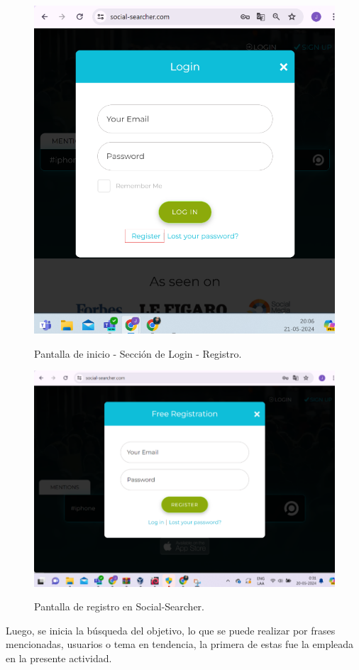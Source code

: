\documentclass[stu, 11pt, letterpaper, donotrepeattitle, floatsintext, natbib]{apa7}
\begin{document}
\begin{figure}[H]
\centering
\caption{Pantalla de inicio - Sección de Login - Registro.}
\includegraphics[width=0.75\linewidth]{osi6.png} %
\label{fig:OverallEffect}
\end{figure}

\begin{figure}[H]
\centering
\caption{Pantalla de registro en Social-Searcher.}
\includegraphics[width=0.75\linewidth]{osi7.png} %
\label{fig:OverallEffect}
\end{figure}

Luego, se inicia la búsqueda del objetivo, lo que se puede realizar por frases mencionadas, usuarios o tema en tendencia, la primera de estas fue la empleada en la presente actividad.
\end{document}
